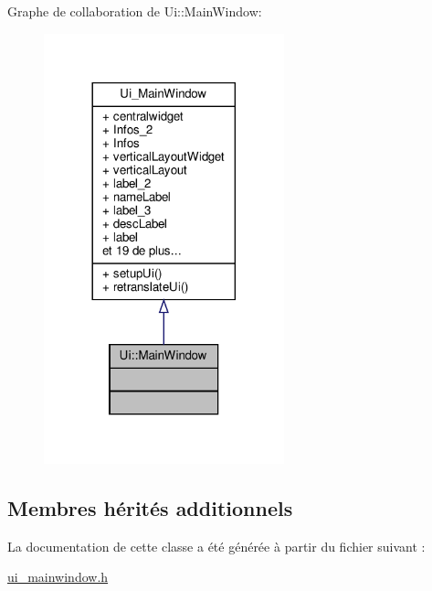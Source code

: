 Graphe de collaboration de Ui\+:\+:Main\+Window\+:\nopagebreak
\begin{figure}[H]
\begin{center}
\leavevmode
\includegraphics[width=197pt]{classUi_1_1MainWindow__coll__graph}
\end{center}
\end{figure}
\subsection*{Membres hérités additionnels}


La documentation de cette classe a été générée à partir du fichier suivant \+:\begin{DoxyCompactItemize}
\item 
\hyperlink{ui__mainwindow_8h}{ui\+\_\+mainwindow.\+h}\end{DoxyCompactItemize}
